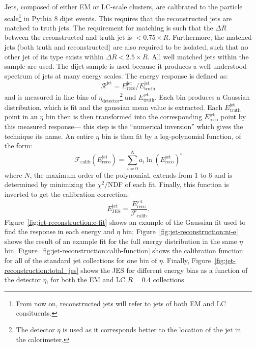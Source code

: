 Jets, composed of either EM or LC-scale clusters, are calibrated to the particle scale\footnote{From now on, reconstructed jets will refer to jets of both EM and LC consituents.} in Pythia 8 dijet events. This requires that the reconstructed jets are matched to truth jets. The requirement for matching is such that the $\Delta R$ between the reconstructed and truth jet is $<0.75\times R$. Furthermore, the matched jets (both truth and reconstructed) are also required to be isolated, such that no other jet of its type exists within $\Delta R < 2.5\times R$. All well matched jets within the sample are used. The dijet sample is used because it produces a well-understood spectrum of jets at many energy scales. The energy response is defined as:
%
\begin{equation}
\mathcal{R}^{\mathrm{jet}} = E^{\mathrm{jet}}_{\mathrm{reco}} /  E^{\mathrm{jet}}_{\mathrm{truth}} 
\end{equation}
%
and is measured in fine bins of $\eta_{\mathrm{detector}}$\footnote{The detector $\eta$ is used as it corresponds better to the location of the jet in the calorimeter.} and $E^{\mathrm{jet}}_{\mathrm{truth}}$. Each bin produces a Gaussian distribution, which is fit and the gaussian mean value is extracted. Each $E^{\mathrm{jet}}_{\mathrm{truth}}$ point in an $\eta$ bin then is then transformed into the corresponding $E^{\mathrm{jet}}_{\mathrm{reco}}$ point by this measured response--- this step is the ``numerical inversion'' which gives the technique its name. An entire $\eta$ bin is then fit by a log-polynomial function, of the form:
%
\begin{equation}
\mathcal{F}_\mathrm{calib}\left(E^{\mathrm{jet}}_{\mathrm{reco}}\right) = \sum_{i=0}^N a_i \ln \left( E^{\mathrm{jet}}_{\mathrm{reco}} \right)^i
\end{equation}
%
where $N$, the maximum order of the polynomial, extends from 1 to 6 and is determined by minimizing the $\chi^2/$NDF of each fit. Finally, this function is inverted to get the calibration correction:
%
\begin{equation}
E^{\mathrm{jet}}_{\mathrm{JES}} = \frac{E^{\mathrm{jet}}_{\mathrm{reco}}}{\mathcal{F}_\mathrm{calib}}.
\end{equation}
%
Figure~\ref{fig:jet-reconstruction:e-fit} shows an example of the Gaussian fit used to find the response in each energy and $\eta$ bin; Figure~\ref{fig:jet-reconstruction:ni-e} shows the result of an example fit for the full energy distribution in the same $\eta$ bin. Figure~\ref{fig:jet-reconstruction:calib-function} shows the calibration function for all of the standard jet collections for one bin of $\eta$. Finally, Figure~\ref{fig:jet-reconstruction:total_jes} shows the JES for different energy bins as a function of the detector $\eta$, for both the EM and LC $R=0.4$ collections.

